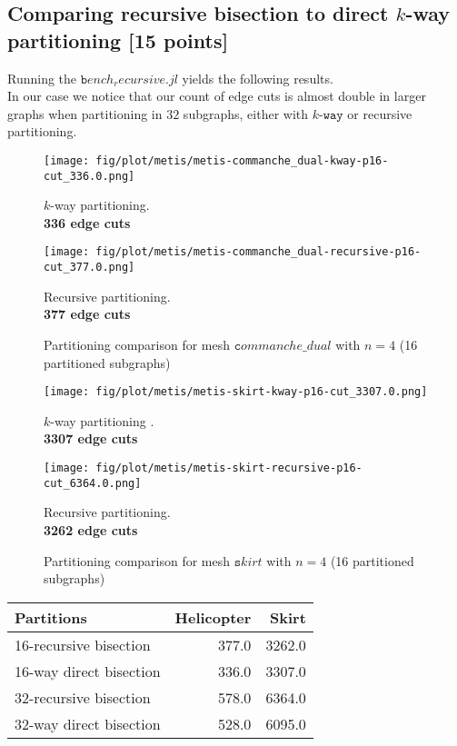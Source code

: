 \documentclass[unicode,11pt,a4paper,oneside,numbers=endperiod,openany]{scrartcl}
\begin{document}
\clearpage
\subsection{Comparing recursive bisection to direct $k$-way partitioning [15 points]}
Running the $\texttt bench_recursive.jl$ yields the following results.\\
In our case we notice that our count of edge cuts is almost double in larger graphs when partitioning in $32$ subgraphs, either with $k\texttt {-way}$ or recursive partitioning.
\begin{figure}[h!]
    \begin{minipage}{0.5\textwidth}
        \centering
        \texttt{[image: fig/plot/metis/metis-commanche\_dual-kway-p16-cut\_336.0.png]}
        \caption{$k$-way partitioning.\\\textbf{336 edge cuts}}
    \end{minipage}
    \begin{minipage}{0.5\textwidth}
        \centering
        \texttt{[image: fig/plot/metis/metis-commanche\_dual-recursive-p16-cut\_377.0.png]}
        \caption{Recursive partitioning.\\\textbf{377 edge cuts}}
    \end{minipage}
    \caption*{Partitioning comparison for mesh $\texttt commanche\_dual$ with $n=4$ (16 partitioned subgraphs)}
\end{figure}
\begin{figure}[h!]
    \begin{minipage}{0.5\textwidth}
        \centering
        \texttt{[image: fig/plot/metis/metis-skirt-kway-p16-cut\_3307.0.png]}
        \caption{$k$-way partitioning .\\\textbf{3307 edge cuts}}
    \end{minipage}
    \begin{minipage}{0.5\textwidth}
        \centering
        \texttt{[image: fig/plot/metis/metis-skirt-recursive-p16-cut\_6364.0.png]}
        \caption{Recursive partitioning.\\\textbf{3262 edge cuts}}
    \end{minipage}
    \caption*{Partitioning comparison for mesh $\texttt skirt$ with $n=4$ (16 partitioned subgraphs)}
\end{figure}

\begin{table}[h!]
\centering
\begin{tabular}{l|r|r} \hline\hline 
              Partitions & Helicopter &  Skirt \\
\hline
  16-recursive bisection &      377.0 & 3262.0 \\
 16-way direct bisection &      336.0 & 3307.0 \\
  32-recursive bisection &      578.0 & 6364.0 \\
 32-way direct bisection &      528.0 & 6095.0 \\
 \hline \hline
\end{tabular}              
\label{table:Compare_Metis}
\end{table}
\end{document}

